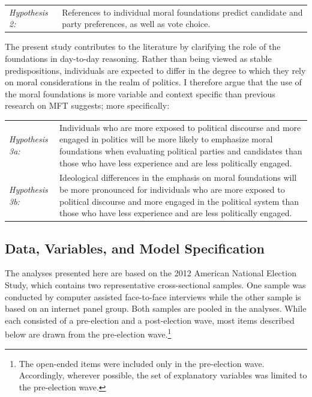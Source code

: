 \documentclass[12pt]{article}
\begin{document}
\vspace{0.3cm}
\begin{tabular}{lp{12cm}}
\textsl{Hypothesis 2:} & References to individual moral foundations predict candidate and party preferences, as well as vote choice. \\
\end{tabular}
\vspace{0.5cm}

The present study contributes to the literature by clarifying the role of the foundations in day-to-day reasoning. Rather than being viewed as stable predispositions, individuals are expected to differ in the degree to which they rely on moral considerations in the realm of politics. I therefore argue that the use of the moral foundations is more variable and context specific than previous research on MFT suggests; more specifically:

\vspace{0.3cm}
\begin{tabular}{lp{12cm}}
\textsl{Hypothesis 3a:} & Individuals who are more exposed to political discourse and more engaged in politics will be more likely to emphasize moral foundations when evaluating political parties and candidates than those who have less experience and are less politically engaged. \\
\textsl{Hypothesis 3b:} & Ideological differences in the emphasis on moral foundations will be more pronounced for individuals who are more exposed to political discourse and more engaged in the political system than those who have less experience and are less politically engaged.
\end{tabular}
\vspace{0.5cm}







\subsection{Data, Variables, and Model Specification}

The analyses presented here are based on the 2012 American National Election Study, which contains two representative cross-sectional samples. One sample was conducted by computer assisted face-to-face interviews while the other sample is based on an internet panel group. Both samples are pooled in the analyses. While each consisted of a pre-election and a post-election wave, most items described below are drawn from the pre-election wave.\footnote{The open-ended items were included only in the pre-election wave. Accordingly, wherever possible, the set of explanatory variables was limited to the pre-election wave.}
\end{document}

